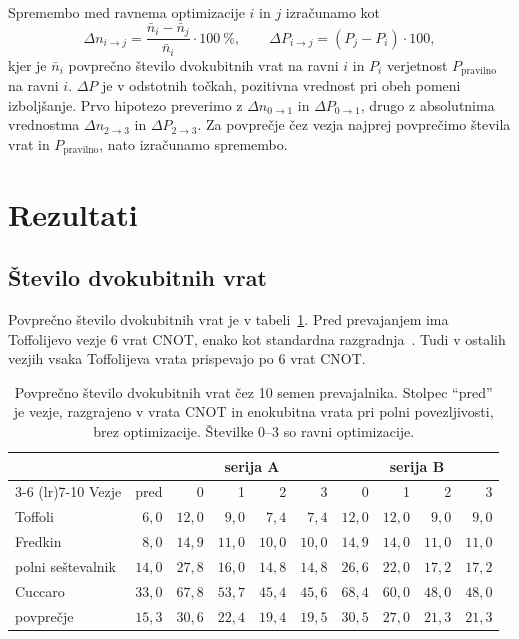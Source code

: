 Spremembo med ravnema optimizacije $i$ in $j$ izračunamo kot
\begin{equation}
\Delta n_{i \to j} = \frac{\bar{n}_i - \bar{n}_j}{\bar{n}_i} \cdot 100~\% ,
\qquad
\Delta P_{i \to j} = \left( P_j - P_i \right) \cdot 100 ,
\label{g10:eq:spremembe}
\end{equation}
kjer je $\bar{n}_i$ povprečno število dvokubitnih vrat na ravni $i$
in $P_i$ verjetnost $P_\text{pravilno}$ na ravni $i$.
$\Delta P$ je v odstotnih točkah,
pozitivna vrednost pri obeh pomeni izboljšanje.
Prvo hipotezo preverimo z $\Delta n_{0\to1}$ in $\Delta P_{0\to1}$,
drugo z absolutnima vrednostma $\Delta n_{2\to3}$ in $\Delta P_{2\to3}$.
Za povprečje čez vezja najprej povprečimo števila vrat
in $P_\text{pravilno}$, nato izračunamo spremembo.


\section{Rezultati}
\label{g10:sec:rezultati}

\subsection{Število dvokubitnih vrat}
\label{g10:sec:rez_vrata}

Povprečno število dvokubitnih vrat je v tabeli~\ref{g10:tab:vrata}.
Pred prevajanjem ima Toffolijevo vezje 6 vrat CNOT,
enako kot standardna razgradnja~\cite{nielsen2010}.
Tudi v ostalih vezjih vsaka Toffolijeva vrata
prispevajo po 6 vrat CNOT.

\begin{table}[htbp]
\caption{Povprečno število dvokubitnih vrat čez 10 semen prevajalnika.
Stolpec \enquote{pred} je vezje, razgrajeno v vrata CNOT
in enokubitna vrata pri polni povezljivosti, brez optimizacije.
Številke 0--3 so ravni optimizacije.}
\label{g10:tab:vrata}
\centering
\small
\setlength{\tabcolsep}{4pt}
\begin{tabular}{lrrrrrrrrr}
\toprule
 & & \multicolumn{4}{c}{serija A} & \multicolumn{4}{c}{serija B} \\
\cmidrule(lr){3-6} \cmidrule(lr){7-10}
Vezje & pred & 0 & 1 & 2 & 3 & 0 & 1 & 2 & 3 \\
\midrule
Toffoli & $6{,}0$ & $12{,}0$ & $9{,}0$ & $7{,}4$ & $7{,}4$ & $12{,}0$ & $12{,}0$ & $9{,}0$ & $9{,}0$ \\
Fredkin & $8{,}0$ & $14{,}9$ & $11{,}0$ & $10{,}0$ & $10{,}0$ & $14{,}9$ & $14{,}0$ & $11{,}0$ & $11{,}0$ \\
polni seštevalnik & $14{,}0$ & $27{,}8$ & $16{,}0$ & $14{,}8$ & $14{,}8$ & $26{,}6$ & $22{,}0$ & $17{,}2$ & $17{,}2$ \\
Cuccaro & $33{,}0$ & $67{,}8$ & $53{,}7$ & $45{,}4$ & $45{,}6$ & $68{,}4$ & $60{,}0$ & $48{,}0$ & $48{,}0$ \\
\midrule
povprečje & $15{,}3$ & $30{,}6$ & $22{,}4$ & $19{,}4$ & $19{,}5$ & $30{,}5$ & $27{,}0$ & $21{,}3$ & $21{,}3$ \\
\bottomrule
\end{tabular}
\end{table}

